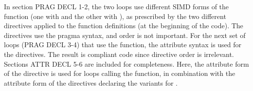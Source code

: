 In section PRAG DECL 1-2, the two loops use different SIMD forms of the  function
(one with  and the other with ), 
as prescribed by the two different  directives
applied to the  function definitions (at the beginning of the code). 
The directives use the pragma syntax, and order is not important. 
For the next set of loops 
(PRAG DECL 3-4) that use the  function, the attribute syntax is 
used for the  directives. 
The result is compliant code since directive order is irrelevant.
Sections ATTR DECL 5-6 are included for completeness. Here, the attribute 
form of the  directive is used for loops calling the  function, 
in combination with the attribute form of the  
directives declaring the variants for .

